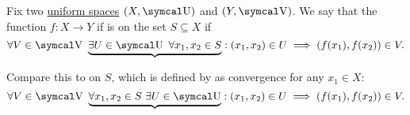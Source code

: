 \begin{definition}\label{def:uniform_continuity}
  Fix two \hyperref[def:uniform_space]{uniform spaces} \( (X, \CU) \) and \( (Y, \CV) \). We say that the function \( f: X \to Y \) if is  on the set \( S \subseteq X \) if
  \begin{equation}\label{def:uniform_continuity/uniform}
    \forall V \in \CV \ \underbrace{\exists U \in \CU \ \forall x_1, x_2 \in S} : (x_1, x_2) \in U \implies (f(x_1), f(x_2)) \in V.
  \end{equation}

  Compare this to  on \( S \), which is defined by  as convergence for any \( x_1 \in X \):
  \begin{equation}\label{def:uniform_continuity/pointwise}
    \forall V \in \CV \ \underbrace{\forall x_1, x_2 \in S \ \exists U \in \CU} : (x_1, x_2) \in U \implies (f(x_1), f(x_2)) \in V.
  \end{equation}
\end{definition}

